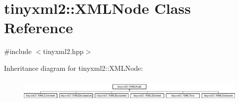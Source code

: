 \hypertarget{classtinyxml2_1_1_x_m_l_node}{\section{tinyxml2\-:\-:X\-M\-L\-Node Class Reference}
\label{classtinyxml2_1_1_x_m_l_node}
}


{\ttfamily \#include $<$tinyxml2.\-hpp$>$}

Inheritance diagram for tinyxml2\-:\-:X\-M\-L\-Node\-:\begin{figure}[H]
\begin{center}
\leavevmode
\includegraphics[height=1.145194cm]{classtinyxml2_1_1_x_m_l_node}
\end{center}
\end{figure}
